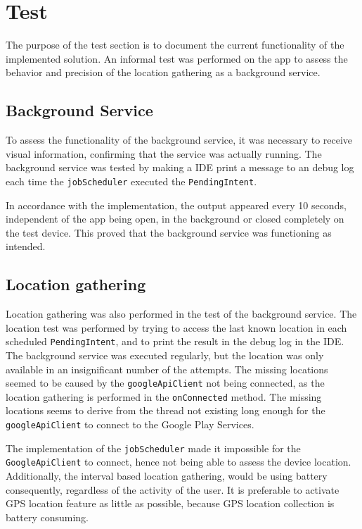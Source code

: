 \section{Test} \label{sec:s2test}
The purpose of the test section is to document the current functionality of the implemented solution.
An informal test was performed on the app to assess the behavior and precision of the location gathering as a background service.

\subsection{Background Service}
To assess the functionality of the background service, it was necessary to receive visual information, confirming that the service was actually running.
The background service was tested by making a IDE print a message to an debug log each time the \texttt{jobScheduler} executed the \texttt{PendingIntent}.

In accordance with the implementation, the output appeared every 10 seconds, independent of the app being open, in the background or closed completely on the test device.
This proved that the background service was functioning as intended.

\subsection{Location gathering} 
Location gathering was also performed in the test of the background service.
The location test was performed by trying to access the last known location in each scheduled \texttt{PendingIntent}, and to print the result in the debug log in the IDE.
The background service was executed regularly, but the location was only available in an insignificant number of the attempts.
The missing locations seemed to be caused by the \texttt{googleApiClient} not being connected, as the location gathering is performed in the \texttt{onConnected} method.
The missing locations seems to derive from the thread not existing long enough for the \texttt{googleApiClient} to connect to the Google Play Services.

The implementation of the \texttt{jobScheduler} made it impossible for the \texttt{GoogleApiClient} to connect, hence not being able to assess the device location.
Additionally, the interval based location gathering, would be using battery consequently, regardless of the activity of the user. 
It is preferable to activate GPS location feature as little as possible, because GPS location collection is battery consuming\citep{fuckGPS}.